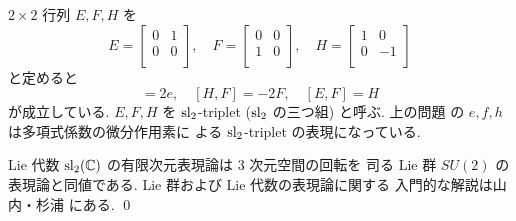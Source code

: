\documentclass[12pt,twoside]{jarticle}
\begin{document}
\begin{guide}
  $2\times 2$ 行列 $E,F,H$ を
  \begin{equation*}
    E = 
    \begin{bmatrix}
      0 & 1 \\
      0 & 0 \\
    \end{bmatrix},
    \quad
    F = 
    \begin{bmatrix}
      0 & 0 \\
      1 & 0 \\
    \end{bmatrix},
    \quad
    H =
    \begin{bmatrix}
      1 & 0 \\
      0 & -1 \\
    \end{bmatrix}
  \end{equation*}
  と定めると
  \begin{equation*}
    [H,E]=2e, \quad [H,F]=-2F, \quad [E,F]=H
  \end{equation*}
  が成立している.  $E,F,H$ を $\mathrm{sl}_2$-triplet ($\mathrm{sl}_2$ の三つ組)
  と呼ぶ.  上の問題  の $e,f,h$ は多項式係数の微分作用素に
  よる $\mathrm{sl}_2$-triplet の表現になっている.
  
  Lie 代数 $\mathrm{sl}_2({\mathbb C})$ の有限次元表現論は $3$ 次元空間の回転を
  司る Lie 群 $SU(2)$ の表現論と同値である.
  Lie 群および Lie 代数の表現論に関する
  入門的な解説は山内・杉浦 \cite{YS} にある.
  \qed
\end{guide}
\end{document}
